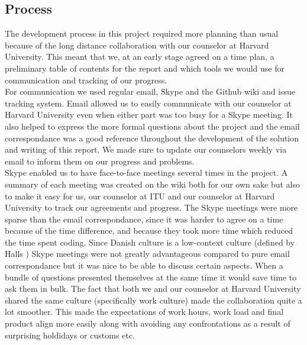 
\subsection{Process}
\label{process}


The development process in this project required more planning than usual because of the long distance collaboration with our counselor at Harvard University. This meant that we, at an early stage agreed on a time plan, a preliminary table of contents for the report and which tools we would use for communication and tracking of our progress. \\

For communication we used regular email, Skype and the Github \cite{github} wiki and issue tracking system. Email allowed us to easily communicate with our counselor at Harvard University even when either part was too busy for a Skype meeting. It also helped to express the more formal questions about the project and the email correspondance was a good reference throughout the development of the solution and writing of this report. We made sure to update our counselors weekly via email to inform them on our progress and problems.\\

Skype enabled us to have face-to-face meetings several times in the project. A summary of each meeting was created on the wiki both for our own sake but also to make it easy for us, our counselor at ITU and our counselor at Harvard University to track our agreements and progress. The Skype meetings were more sparse than the email correspondance, since it was harder to agree on a time because of the time difference, and because they took more time which reduced the time spent coding. Since Danish culture is a low-context culture (defined by Halls \cite{halls}) Skype meetings were not greatly advantageous compared to pure email correspondance but it was nice to be able to discuss certain aspects. When a bundle of questions presented themselves at the same time it would save time to ask them in bulk. The fact that both we and our counselor at Harvard University shared the same culture (specifically work culture) made the collaboration quite a lot smoother. This made the expectations of work hours, work load and final product align more easily along with avoiding any confrontations as a result of surprising holdidays or customs etc. \\

